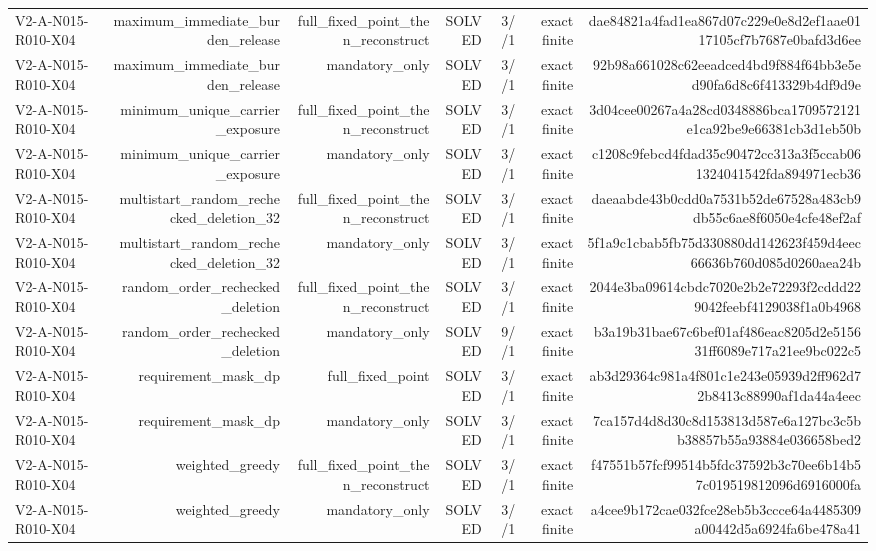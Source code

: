 {\begin{longtable}{lrrrrrr}
V2-A-N015-R010-X04 & maximum\_immediate\_burden\_release & full\_fixed\_point\_then\_reconstruct & SOLVED & 3//1 & exact finite & dae84821a4fad1ea867d07c229e0e8d2ef1aae0117105cf7b7687e0bafd3d6ee \\
V2-A-N015-R010-X04 & maximum\_immediate\_burden\_release & mandatory\_only & SOLVED & 3//1 & exact finite & 92b98a661028c62eeadced4bd9f884f64bb3e5ed90fa6d8c6f413329b4df9d9e \\
V2-A-N015-R010-X04 & minimum\_unique\_carrier\_exposure & full\_fixed\_point\_then\_reconstruct & SOLVED & 3//1 & exact finite & 3d04cee00267a4a28cd0348886bca1709572121e1ca92be9e66381cb3d1eb50b \\
V2-A-N015-R010-X04 & minimum\_unique\_carrier\_exposure & mandatory\_only & SOLVED & 3//1 & exact finite & c1208c9febcd4fdad35c90472cc313a3f5ccab061324041542fda894971ecb36 \\
V2-A-N015-R010-X04 & multistart\_random\_rechecked\_deletion\_32 & full\_fixed\_point\_then\_reconstruct & SOLVED & 3//1 & exact finite & daeaabde43b0cdd0a7531b52de67528a483cb9db55c6ae8f6050e4cfe48ef2af \\
V2-A-N015-R010-X04 & multistart\_random\_rechecked\_deletion\_32 & mandatory\_only & SOLVED & 3//1 & exact finite & 5f1a9c1cbab5fb75d330880dd142623f459d4eec66636b760d085d0260aea24b \\
V2-A-N015-R010-X04 & random\_order\_rechecked\_deletion & full\_fixed\_point\_then\_reconstruct & SOLVED & 3//1 & exact finite & 2044e3ba09614cbdc7020e2b2e72293f2cddd229042feebf4129038f1a0b4968 \\
V2-A-N015-R010-X04 & random\_order\_rechecked\_deletion & mandatory\_only & SOLVED & 9//1 & exact finite & b3a19b31bae67c6bef01af486eac8205d2e515631ff6089e717a21ee9bc022c5 \\
V2-A-N015-R010-X04 & requirement\_mask\_dp & full\_fixed\_point & SOLVED & 3//1 & exact finite & ab3d29364c981a4f801c1e243e05939d2ff962d72b8413c88990af1da44a4eec \\
V2-A-N015-R010-X04 & requirement\_mask\_dp & mandatory\_only & SOLVED & 3//1 & exact finite & 7ca157d4d8d30c8d153813d587e6a127bc3c5bb38857b55a93884e036658bed2 \\
V2-A-N015-R010-X04 & weighted\_greedy & full\_fixed\_point\_then\_reconstruct & SOLVED & 3//1 & exact finite & f47551b57fcf99514b5fdc37592b3c70ee6b14b57c019519812096d6916000fa \\
V2-A-N015-R010-X04 & weighted\_greedy & mandatory\_only & SOLVED & 3//1 & exact finite & a4cee9b172cae032fce28eb5b3ccce64a4485309a00442d5a6924fa6be478a41 \\

\end{longtable}}
